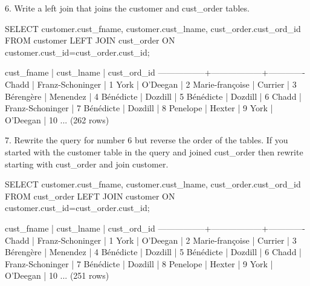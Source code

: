 6. Write a left join that joins the customer and cust\_order tables.
\begin{sql}
SELECT customer.cust_fname, customer.cust_lname, cust_order.cust_ord_id FROM customer
LEFT JOIN cust_order ON customer.cust_id=cust_order.cust_id;
\end{sql}
\begin{pseudo*}
   cust_fname    |    cust_lname    | cust_ord_id
-----------------+------------------+-------------
 Chadd           | Franz-Schoninger |           1
 York            | O'Deegan         |           2
 Marie-françoise | Currier          |           3
 Bérengère       | Menendez         |           4
 Bénédicte       | Dozdill          |           5
 Bénédicte       | Dozdill          |           6
 Chadd           | Franz-Schoninger |           7
 Bénédicte       | Dozdill          |           8
 Penelope        | Hexter           |           9
 York            | O'Deegan         |          10
 ...
(262 rows)
\end{pseudo*}

7. Rewrite the query for number 6 but reverse the order of the tables. If you started with the customer table in the query and joined cust\_order then rewrite starting with cust\_order and join customer. 
\begin{sql}
SELECT customer.cust_fname, customer.cust_lname, cust_order.cust_ord_id FROM cust_order
LEFT JOIN customer ON customer.cust_id=cust_order.cust_id;
\end{sql}
\begin{pseudo*}
   cust_fname    |    cust_lname    | cust_ord_id
-----------------+------------------+-------------
 Chadd           | Franz-Schoninger |           1
 York            | O'Deegan         |           2
 Marie-françoise | Currier          |           3
 Bérengère       | Menendez         |           4
 Bénédicte       | Dozdill          |           5
 Bénédicte       | Dozdill          |           6
 Chadd           | Franz-Schoninger |           7
 Bénédicte       | Dozdill          |           8
 Penelope        | Hexter           |           9
 York            | O'Deegan         |          10
 ...
(251 rows)
\end{pseudo*}

